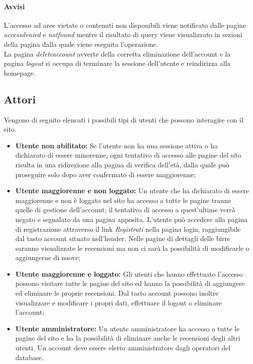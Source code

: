 \paragraph{Avvisi}
L'accesso ad aree vietate o contenuti non disponibili viene notificato dalle pagine \textit{accessdenied} e \textit{notfound} mentre il risultato di query viene visualizzato in sezioni della pagina dalla quale viene eseguita l'operazione.\\
La pagina \textit{deleteaccount} avverte della corretta eliminazione dell'account e la pagina \textit{logout} si occupa di terminare la sessione dell'utente e reindirizza alla homepage.

\subsection{Attori}
Vengono di seguito elencati i possibili tipi di utenti che possono interagire con il sito.
\begin{itemize}
\item \textbf{Utente non abilitato:} Se l'utente non ha una sessione attiva o ha dichiarato di essere minorenne, ogni tentativo di accesso alle pagine del sito risulta in una ridirezione alla pagina di verifica dell'età, dalla quale può proseguire solo dopo aver confermato di essere maggiorenne;
\item \textbf{Utente maggiorenne e non loggato:} Un utente che ha dichiarato di essere maggiorenne e non è loggato nel sito ha accesso a tutte le pagine tranne quelle di gestione dell'account; il tentativo di accesso a quest'ultime verrà negato e segnalato da una pagina apposita.
L'utente può accedere alla pagina di registrazione attraverso il link \textit{Registrati} nella pagina login, raggiungibile dal tasto account situato nell'header.
Nelle pagine di dettagli delle birre saranno visualizzate le recensioni ma non ci sarà la possibilità di modificarle o aggiungerne di nuove;
\item \textbf{Utente maggiorenne e loggato:} Gli utenti che hanno effettuato l'accesso possono visitare tutte le pagine del sito ed hanno la possibilità di aggiungere ed eliminare le proprie recensioni.
Dal tasto account possono inoltre visualizzare e modificare i propri dati, effettuare il logout o eliminare l'account;
\item \textbf{Utente amministratore:} Un utente amministratore ha accesso a tutte le pagine del sito e ha la possibilità di eliminare anche le recensioni degli altri utenti.
Un account deve essere eletto amministratore dagli operatori del database.
\end{itemize}

